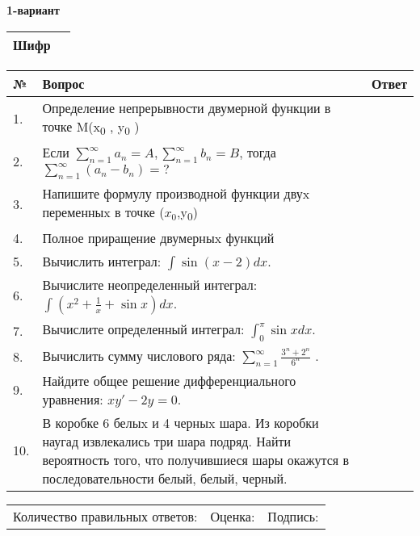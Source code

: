 \documentclass{article}
\begin{document}


  \textbf{1-вариант}\\
  
  \bgroup
  \def\arraystretch{1.6} %
  
  \begin{tabular}{|m{5.7cm}|m{9.5cm}|}
  \hline
  Шифр & \\
  \hline
  \end{tabular}
  
  \vspace{1cm}
  
  \begin{tabular}{|m{0.7cm}|m{10cm}|m{4cm}|}
  \hline
  № & Вопрос & Ответ \\
  \hline
  1. & Определение непрерывности двумерной функции в точке M(x\textsubscript{0} , y\textsubscript{0} ) &  \\
  \hline
  2. & Если \(\sum_{n = 1}^{\infty}a_{n} = A,\sum_{n = 1}^{\infty}b_{n} = B\), тогда \(\sum_{n = 1}^{\infty}\left( a_{n} - b_{n} \right) = ?\) &  \\
  \hline
  3. & Напишите формулу производной функции двуx переменныx в точке (\(x_{0}\),y\textsubscript{0}) &  \\
  \hline
  4. & Полное приращение двумерныx функций &  \\
  \hline
  5. & Вычислить интеграл: \(\int{\sin(x - 2)dx}\). &  \\
  \hline
  6. & Вычислите неопределенный интеграл: \(\int{\left( x^{2} + \frac{1}{x} + \sin x \right)dx}\). &  \\
  \hline
  7. & Вычислите определенный интеграл: \(\int_{0}^{\pi}{\sin xdx}\). &  \\
  \hline
  8. & Вычислить сумму числового ряда: \(\sum_{n = 1}^{\infty}\frac{3^{n} + 2^{n}}{6^{n}}\) . &  \\
  \hline
  9. & Найдите общее решение дифференциального уравнения: \(xy' - 2y = 0\). &  \\
  \hline
  10. & В коробке 6 белыx и 4 черныx шара. Из коробки наугад извлекались три шара подряд. Найти вероятность того, что получившиеся шары окажутся в последовательности белый, белый, черный. &  \\
  \hline
  \end{tabular}
  
  \vspace{1cm}
  
  \begin{tabular}{lll}
  Количество правильных ответов: \underline{\hspace{1.5cm}} & 
  Оценка: \underline{\hspace{1.5cm}} & 
  Подпись: \underline{\hspace{2cm}} \\
  \end{tabular}
  
\end{document}
